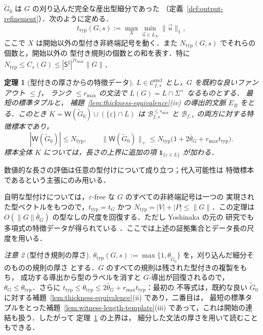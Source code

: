 \documentclass[11pt,a4paper]{ltjsarticle}
\numberwithin{equation}{section}
\theoremstyle{plain}
\newtheorem{theorem}{定理}[section]
\theoremstyle{definition}
\theoremstyle{remark}
\newtheorem{remark}[theorem]{注意}
\newcommand{\Wit}{\mathsf{W}}
\newcommand{\Cmcf}[2]{\mathcal{C}^{\mathrm{mcf}}_{#1,#2}}
\newcommand{\tuple}[1]{\vec{#1}}
\newcommand{\eps}{\varepsilon}
\theoremstyle{plain}
\begin{document}
$\widetilde G_0$ は $G$ の刈り込んだ完全な産出型細分であった
（定義~\ref{def:output-refinement}）．次のように定める．
\[
 t_{\mathrm{typ}}(G,s):=\max_{X}\min_{\tuple u\in L_X}\|\tuple u\|_1,
\]
ここで $X$ は開始以外の型付き非終端記号を動く．また
$N_{\mathrm{typ}}(G,s)$ でそれらの個数と，開始以外の
型付き規則の個数との和を表す．特に $N_{\mathrm{typ}}\le C_s(G)\le
|\mathsf S^\sharp|^{fr_{\max}}\|G\|$．


\begin{theorem}[型付きの厚さからの特徴データ]
\label{thm:data-from-typed-thickness}
$L\in\Cmcf{f}{s}$ とし，$G$ を既約な良いファンアウト $\le f$，
ランク $\le r_{\max}$ の文法で $L(G)=L\cap\Sigma^+$ なるものとする．
最短の標準タプルと，
補題~\ref{lem:thickness-equivalence}(iv) の導出的文脈 $E_B$ をとる．このとき
$K=\Wit(\widetilde G_0)\cup(\{\eps\}\cap L)$ は
$\mathcal B^{\le r_{\max}}_{f,s}$ と $\mathcal B_{f,s}$ の両方に対する特徴標本であり，
\[
 |\Wit(\widetilde G_0)|\le N_{\mathrm{typ}},\qquad
 \|\Wit(\widetilde G_0)\|_+\le
 N_{\mathrm{typ}}\bigl(1+2\bar\theta_G+r_{\max}t_{\mathrm{typ}}\bigr).
\]
標本全体 $K$ については，長さの上界に追加の項
$\mathbf 1_{\{\eps\in L\}}$ が加わる．
\end{theorem}

数値的な長さの評価は任意の型付けについて成り立つ；代入可能性は
特徴標本であるという主張にのみ用いる．


自明な型付けについては，$\eps$-free な $G$ のすべての非終端記号は一つの
実現された型ベクトルをもつので，$t_{\mathrm{typ}}=t_G$ かつ
$N_{\mathrm{typ}}=|V|+|P|\le\|G\|$．この定理は
$O(\|G\|\bar\theta_G)$ の型なしの尺度を回復する．ただし Yoshinaka の元の
研究でも多項式の特徴データが得られている
\cite{Yoshinaka2011}．ここでは上述の証拠集合とデータ長の尺度を用いる．

\begin{remark}[型付き規則の厚さ]
\label{rem:typed-thickness-equivalence}
$\theta_{\mathrm{typ}}(G,s):=\max\{1,\theta_{\widetilde G_0}\}$ を，刈り込んだ細分そのものの規則の厚さ
とする．$G$ のすべての規則は残された型付きの複製をもち，
成功する導出から型のラベルを消すと $G$-導出が回復されるので，
$\theta_G\le\theta_{\mathrm{typ}}$．さらに
$t_{\mathrm{typ}}\le\theta_{\mathrm{typ}}\le2\bar\theta_G+r_{\max}t_{\mathrm{typ}}$：最初の
不等式は，既約な良い
$\widetilde G_0$ に対する補題~\ref{lem:thickness-equivalence}(ii) であり，二番目は，
最短の標準タプルをとった補題~\ref{lem:witness-length-template}(iii) であって，これは開始の連結も扱う．したがって
定理~\ref{thm:data-from-typed-thickness} の上界は，
細分した文法の厚さを用いて読むこともできる．
\end{remark}
\end{document}
